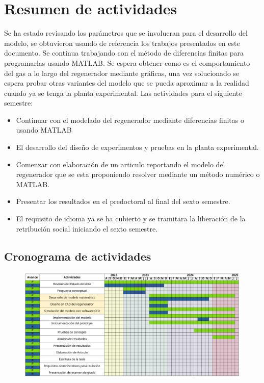 \documentclass[12pt,letterpaper,final]{article}%
\begin{document}
\section{Resumen de actividades}
Se ha estado revisando los parámetros que se involucran para el desarrollo del modelo, se obtuvieron usando de referencia los trabajos presentados en este documento. Se continua trabajando con el método de diferencias finitas para programarlas usando MATLAB. Se espera obtener como es el comportamiento del gas a lo largo del regenerador mediante gráficas, una vez solucionado se espera probar otras variantes del modelo que se pueda aproximar a la realidad cuando ya se tenga la planta experimental.
\newline
Las actividades para el siguiente semestre:
\begin{itemize}
	\item Continuar con el modelado del regenerador mediante diferencias finitas o usando MATLAB
	\item El desarrollo del diseño de experimentos y pruebas en la planta experimental.
	\item Comenzar con elaboración de un articulo reportando el modelo del regenerador que se esta proponiendo resolver mediante un método numérico o MATLAB.
	\item Presentar los resultados en el predoctoral al final del sexto semestre.
	\item El requisito de idioma ya se ha cubierto y se tramitara la liberación de la retribución social iniciando el sexto semestre.
\end{itemize}   

\newpage

\begin{landscape}
	\section{Cronograma de actividades}
	\begin{center}
	\begin{figure}[ht!]
		\includegraphics[scale=0.8]{crono_grama.pdf}
	\end{figure}
	\end{center}	
\end{landscape}

\newpage
\textbf{\textbf{
}}

	
\end{document}
